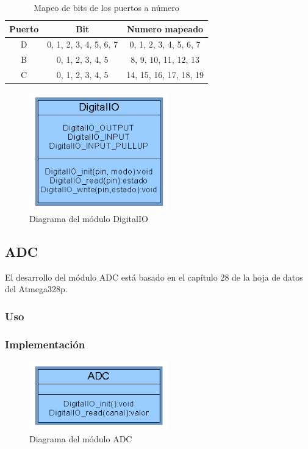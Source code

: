 \begin{table}[!ht]
	\begin{center}
		\begin{tabular}{|c|c|c|}
			\hline
			\textbf{Puerto} & \textbf{Bit} & \textbf{Numero mapeado} \\
			\hline \hline
			D & 0, 1, 2, 3, 4, 5, 6, 7 & 0, 1, 2, 3, 4, 5, 6, 7 \\
			\hline
			B & 0, 1, 2, 3, 4, 5 & 8, 9, 10, 11, 12, 13 \\
			\hline
			C & 0, 1, 2, 3, 4, 5 & 14, 15, 16, 17, 18, 19\\
			\hline
		\end{tabular}
	\end{center}
	\caption{Mapeo de bits de los puertos a número}
	\label{table:\thetable}
\end{table}

\begin{figure}[!ht]
	\centering
	\includegraphics[width=6cm,scale=1]{resources/3_1-moduloDigitalIO.png}
	\caption{Diagrama del módulo DigitalIO}
	\label{fig:\thefigure}
\end{figure}



\subsection{ADC}
El desarrollo del módulo ADC está basado en el capítulo 28 de la hoja de datos del Atmega328p.

\subsubsection{Uso}

\subsubsection{Implementación}

\begin{figure}[!ht]
	\centering
	\includegraphics[width=6cm,scale=1]{resources/3_2-moduloADC.png}
	\caption{Diagrama del módulo ADC}
	\label{fig:\thefigure}
\end{figure}

